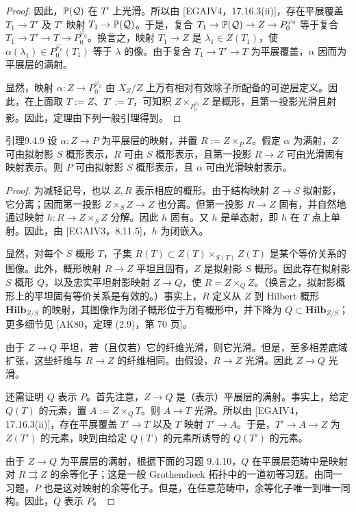 \begin{proof}
因此，$\mathbb P(\mathcal Q)$ 在 $T'$ 上光滑。所以由 [EGAIV4，17.16.3(ii)]，存在平展覆盖 $T_1\to T'$ 及 $T'$ 映射 $T_1\to\mathbb P(\mathcal Q)$。于是，复合 $T_1\to\mathbb P(\mathcal Q)\to Z\to P_0^{\varphi_0}$ 等于复合 $T_1\to T'\to T\to P_0^{\varphi_0}$。换言之，映射 $T_1\to Z$ 是 $\lambda_1\in Z(T_1)$，使 $\alpha(\lambda_1)\in P_0^{\varphi_0}(T_1)$ 等于 $\lambda$ 的像。由于复合 $T_1\to T'\to T$ 为平展覆盖，$\alpha$ 因而为平展层的满射。

显然，映射 $\alpha:Z\to P_0^{\varphi_0}$ 由 $X_Z/Z$ 上万有相对有效除子所配备的可逆层定义。因此，在上面取 $T:=Z$、$T':=T$，可知积 $Z\times_{P_0^{\varphi_0}}Z$ 是概形，且第一投影光滑且射影。因此，定理由下列一般引理得到。
\end{proof}
\begin{origstatement}{引理}{9.4.9}\label{ch09s04:9.4.9}
设 $\alpha:Z\to P$ 为平展层的映射，并置 $R:=Z\times_P Z$。假定 $\alpha$ 为满射，$Z$ 可由拟射影 $S$ 概形表示，$R$ 可由 $S$ 概形表示，且第一投影 $R\to Z$ 可由光滑固有映射表示。则 $P$ 可由拟射影 $S$ 概形表示，且 $\alpha$ 可由光滑映射表示。
\end{origstatement}
\begin{proof}
为减轻记号，也以 $Z,R$ 表示相应的概形。由于结构映射 $Z\to S$ 拟射影，它分离；因而第一投影 $Z\times_S Z\to Z$ 也分离。但第一投影 $R\to Z$ 固有，并自然地通过映射 $h:R\to Z\times_S Z$ 分解。因此 $h$ 固有。又 $h$ 是单态射，即 $h$ 在 $T$ 点上单射。因此，由 [EGAIV3，8.11.5]，$h$ 为闭嵌入。

显然，对每个 $S$ 概形 $T$，子集 $R(T)\subset Z(T)\times_{S(T)}Z(T)$ 是某个等价关系的图像。此外，概形映射 $R\to Z$ 平坦且固有，$Z$ 是拟射影 $S$ 概形。因此存在拟射影 $S$ 概形 $Q$，以及忠实平坦射影映射 $Z\to Q$，使 $R=Z\times_Q Z$。（换言之，拟射影概形上的平坦固有等价关系是有效的。）事实上，$R$ 定义从 $Z$ 到 Hilbert 概形 $\mathbf{Hilb}_{Z/S}$ 的映射，其图像作为闭子概形位于万有概形中，并下降为 $Q\subset\mathbf{Hilb}_{Z/S}$；更多细节见 [AK80，定理 (2.9)，第 70 页]。

由于 $Z\to Q$ 平坦，若（且仅若）它的纤维光滑，则它光滑。但是，至多相差底域扩张，这些纤维与 $R\to Z$ 的纤维相同。由假设，$R\to Z$ 光滑。因此 $Z\to Q$ 光滑。

还需证明 $Q$ 表示 $P$。首先注意，$Z\to Q$ 是（表示）平展层的满射。事实上，给定 $Q(T)$ 的元素，置 $A:=Z\times_Q T$。则 $A\to T$ 光滑。所以由 [EGAIV4，17.16.3(ii)]，存在平展覆盖 $T'\to T$ 以及 $T$ 映射 $T'\to A$。于是，$T'\to A\to Z$ 为 $Z(T')$ 的元素，映到由给定 $Q(T)$ 的元素所诱导的 $Q(T')$ 的元素。

由于 $Z\to Q$ 为平展层的满射，根据下面的习题 9.4.10，$Q$ 在平展层范畴中是映射对 $R\rightrightarrows Z$ 的余等化子；这是一般 Grothendieck 拓扑中的一道初等习题。由同一习题，$P$ 也是这对映射的余等化子。但是，在任意范畴中，余等化子唯一到唯一同构。因此，$Q$ 表示 $P$。
\end{proof}
